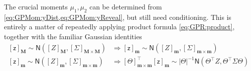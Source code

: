 \documentclass[preprint,12pt]{elsarticle}
\newcommand*{\M}[1]{\ensuremath{#1}\xspace}
\newcommand*{\x}{\times}
\newcommand*{\mi}[1]{\mathbf{#1}}
\newcommand*{\rv}[1]{\mathsf{#1}}
\newcommand*{\te}[2][]{\left\lbrack{#2}\right\rbrack_{#1}}
\newcommand*{\gauss}[2]{\mathsf{N}\!\left({#1,#2}\right)}
\newcommand*{\modulus}[1]{\M{\left\lvert{#1}\right\rvert}}
\begin{document}
    The crucial moments $\mu_{1},\mu_{2}$ can be determined from \cref{eq:GPMom:yDist,eq:GPMom:yReveal}, but still need conditioning. This is entirely a matter of repeatedly applying product formula \cref{eq:GPR:product}, together with the familiar Gaussian identities
    \begin{equation*}
        \begin{aligned}
            \te[\mi{M}]{\rv{z}} \sim \gauss{\te[\mi{M}]{Z}}{\te[\mi{M}\x\mi{M}]{\Sigma}} &\Rightarrow
            \te[\mi{m}]{\rv{z}} \sim \gauss{\te[\mi{m}]{Z}}{\te[\mi{m}\x\mi{m}]{\Sigma}} \\
            \te[\mi{m}]{\rv{z}} \sim \gauss{\te[\mi{m}]{Z}}{\te[\mi{m}\x\mi{m}]{\Sigma}} &\Rightarrow
            \te[\mi{m}\x\mi{m}]{\Theta}^{\intercal}\te[\mi{m}]{\rv{z}} \sim 
            \modulus{\Theta}^{-1}
            \gauss{\Theta^{\intercal}Z}{\Theta^{\intercal}\Sigma\Theta}                        
        \end{aligned}
    \end{equation*}
\end{document}
